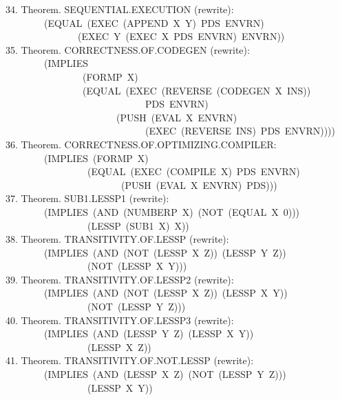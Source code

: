 \documentclass[10pt]{book}
\newenvironment{pubasis}{\begin{flushleft}}{\end{flushleft}}
\begin{document}
\begin{pubasis}
34.     Theorem.  SEQUENTIAL.EXECUTION (rewrite):\\
~~~~~~~~(EQUAL~(EXEC~(APPEND~X~Y)~PDS~ENVRN)\\
~~~~~~~~~~~~~~~(EXEC~Y~(EXEC~X~PDS~ENVRN)~ENVRN))\\

35.     Theorem.  CORRECTNESS.OF.CODEGEN (rewrite):\\
~~~~~~~~(IMPLIES\\
~~~~~~~~~~~~~~~~(FORMP~X)\\
~~~~~~~~~~~~~~~~(EQUAL~(EXEC~(REVERSE~(CODEGEN~X~INS))\\
~~~~~~~~~~~~~~~~~~~~~~~~~~~~~PDS~ENVRN)\\
~~~~~~~~~~~~~~~~~~~~~~~(PUSH~(EVAL~X~ENVRN)\\
~~~~~~~~~~~~~~~~~~~~~~~~~~~~~(EXEC~(REVERSE~INS)~PDS~ENVRN))))\\

36.     Theorem.  CORRECTNESS.OF.OPTIMIZING.COMPILER:\\
~~~~~~~~(IMPLIES~(FORMP~X)\\
~~~~~~~~~~~~~~~~~(EQUAL~(EXEC~(COMPILE~X)~PDS~ENVRN)\\
~~~~~~~~~~~~~~~~~~~~~~~~(PUSH~(EVAL~X~ENVRN)~PDS)))\\

37.     Theorem.  SUB1.LESSP1 (rewrite):\\
~~~~~~~~(IMPLIES~(AND~(NUMBERP~X)~(NOT~(EQUAL~X~0)))\\
~~~~~~~~~~~~~~~~~(LESSP~(SUB1~X)~X))\\

38.     Theorem.  TRANSITIVITY.OF.LESSP (rewrite):\\
~~~~~~~~(IMPLIES~(AND~(NOT~(LESSP~X~Z))~(LESSP~Y~Z))\\
~~~~~~~~~~~~~~~~~(NOT~(LESSP~X~Y)))\\

39.     Theorem.  TRANSITIVITY.OF.LESSP2 (rewrite):\\
~~~~~~~~(IMPLIES~(AND~(NOT~(LESSP~X~Z))~(LESSP~X~Y))\\
~~~~~~~~~~~~~~~~~(NOT~(LESSP~Y~Z)))\\

40.     Theorem.  TRANSITIVITY.OF.LESSP3 (rewrite):\\
~~~~~~~~(IMPLIES~(AND~(LESSP~Y~Z)~(LESSP~X~Y))\\
~~~~~~~~~~~~~~~~~(LESSP~X~Z))\\

41.     Theorem.  TRANSITIVITY.OF.NOT.LESSP (rewrite):\\
~~~~~~~~(IMPLIES~(AND~(LESSP~X~Z)~(NOT~(LESSP~Y~Z)))\\
~~~~~~~~~~~~~~~~~(LESSP~X~Y))\\


\end{pubasis}
\end{document}
